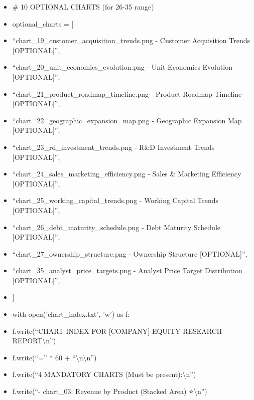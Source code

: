 \documentclass[11pt]{article}
\begin{document}
\begin{itemize}[leftmargin=*,itemsep=2pt,topsep=2pt]
\item {} \# 10 OPTIONAL CHARTS (for 26-35 range)
\item {} optional\_\allowbreak{}charts = [
\item {} ``chart\_\allowbreak{}19\_\allowbreak{}customer\_\allowbreak{}acquisition\_\allowbreak{}trends.png - Customer Acquisition Trends [OPTIONAL]'',
\item {} ``chart\_\allowbreak{}20\_\allowbreak{}unit\_\allowbreak{}economics\_\allowbreak{}evolution.png - Unit Economics Evolution [OPTIONAL]'',
\item {} ``chart\_\allowbreak{}21\_\allowbreak{}product\_\allowbreak{}roadmap\_\allowbreak{}timeline.png - Product Roadmap Timeline [OPTIONAL]'',
\item {} ``chart\_\allowbreak{}22\_\allowbreak{}geographic\_\allowbreak{}expansion\_\allowbreak{}map.png - Geographic Expansion Map [OPTIONAL]'',
\item {} ``chart\_\allowbreak{}23\_\allowbreak{}rd\_\allowbreak{}investment\_\allowbreak{}trends.png - R\&D Investment Trends [OPTIONAL]'',
\item {} ``chart\_\allowbreak{}24\_\allowbreak{}sales\_\allowbreak{}marketing\_\allowbreak{}efficiency.png - Sales \& Marketing Efficiency [OPTIONAL]'',
\item {} ``chart\_\allowbreak{}25\_\allowbreak{}working\_\allowbreak{}capital\_\allowbreak{}trends.png - Working Capital Trends [OPTIONAL]'',
\item {} ``chart\_\allowbreak{}26\_\allowbreak{}debt\_\allowbreak{}maturity\_\allowbreak{}schedule.png - Debt Maturity Schedule [OPTIONAL]'',
\item {} ``chart\_\allowbreak{}27\_\allowbreak{}ownership\_\allowbreak{}structure.png - Ownership Structure [OPTIONAL]'',
\item {} ``chart\_\allowbreak{}35\_\allowbreak{}analyst\_\allowbreak{}price\_\allowbreak{}targets.png - Analyst Price Target Distribution [OPTIONAL]'',
\item {} ]
\item {} with open('chart\_\allowbreak{}index.txt', 'w') as f:
\item {} f.write(``CHART INDEX FOR [COMPANY] EQUITY RESEARCH REPORT\textbackslash{}n'')
\item {} f.write(``='' * 60 + ``\textbackslash{}n\textbackslash{}n'')
\item {} f.write(``4 MANDATORY CHARTS (Must be present):\textbackslash{}n'')
\item {} f.write(``- chart\_\allowbreak{}03: Revenue by Product (Stacked Area) ⭐\textbackslash{}n'')

\end{itemize}
\end{document}
